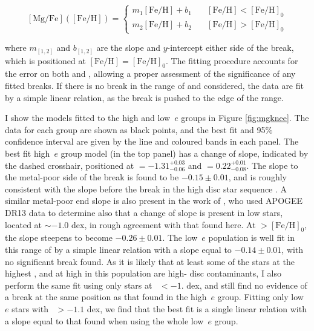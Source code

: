 \begin{equation}
\label{eq:pwlin}
\mathrm{[Mg/Fe]}(\mathrm{[Fe/H]}) =
  \begin{cases}
    m_{1}\mathrm{[Fe/H]} + b_1  &  \quad \mathrm{[Fe/H]} < \mathrm{[Fe/H]}_0\\
    m_{2}\mathrm{[Fe/H]} + b_2  &  \quad \mathrm{[Fe/H]} > \mathrm{[Fe/H]}_0
  \end{cases}
\end{equation}

\noindent where $m_{[1,2]}$ and $b_{[1,2]}$ are the slope and
$y$-intercept either side of the break, which is positioned at
$\mathrm{[Fe/H]}=\mathrm{[Fe/H]}_0$. The fitting procedure accounts
for the error on both \mgfe{} and \feh{}, allowing a proper assessment
of the significance of any fitted breaks. If there is no break in
the range of \mgfe{} and \feh{} considered, the data are fit by a
simple linear relation, as the break is pushed to the edge of the
\feh{} range.

I show the models fitted to the high and low~$e$ groups in Figure
\ref{fig:mgknee}. The data for each group are shown as black
points, and the best fit and 95$\%$ confidence interval are given
by the line and coloured bands in each panel. The best fit high~$e$ group
model (in the top panel) has a change of slope, indicated by the dashed crosshair, positioned at
\feh{}$=-1.31^{+0.03}_{-0.06}$ and \mgfe{}$=0.22^{+0.01}_{-0.08}$.
The  slope to the metal-poor side of the break is found to
be $-0.15\pm{0.01}$, and is roughly consistent with the slope before
the break in the high \mgfe{} disc star sequence \citep[e.g. that
seen in][]{2015ApJ...808..132H}. A similar metal-poor end slope 
is also present in the work of \citet{2018ApJ...852...50F},
who used APOGEE DR13 data to determine also that a change of slope
is present in low \mgfe{} stars, located at \feh{}$\sim-1.0$ dex,
in rough agreement with that found here. At \feh{}$>\mathrm{[Fe/H]}_0$,
the slope steepens to become $-0.26\pm{0.01}$. The low~$e$ population
is well fit in this range of \feh{} by a simple linear relation
with a slope equal to $-0.14\pm{0.01}$, with no significant break
found. As it is likely that at least some of the stars at the highest
\feh{}, and at high \mgfe{} in this population are high-\afe{} disc
contaminants, I also perform the same fit using only stars at \feh{}~$<-1.$
dex, and still find no evidence of a break at the same position as
that found in the high~$e$ group. Fitting only low~$e$ stars with
\feh{}~$>-1.1$ dex, we find that the best fit is a single linear
relation with a slope equal to that found when using the whole
low~$e$ group.

